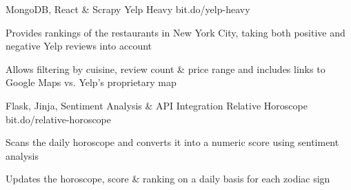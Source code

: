 

\begin{cventries}

 \cventry
    {MongoDB, React \& Scrapy} %
    {Yelp Heavy} %
    {bit.do/yelp-heavy} %
    {} %
    {
      \begin{cvitems} %
        \item {Provides rankings of the restaurants in New York City, taking both positive and negative Yelp reviews into account}
        \item {Allows filtering by cuisine, review count \& price range and includes links to Google Maps vs. Yelp's proprietary map}
      \end{cvitems}
    }

 \cventry
    {Flask, Jinja, Sentiment Analysis \& API Integration} %
    {Relative Horoscope} %
    {bit.do/relative-horoscope} %
    {} %
    {
      \begin{cvitems} %
        \item {Scans the daily horoscope and converts it into a numeric score using sentiment analysis}
        \item {Updates the horoscope, score \& ranking on a daily basis for each zodiac sign}
      \end{cvitems}
    }

\end{cventries}
